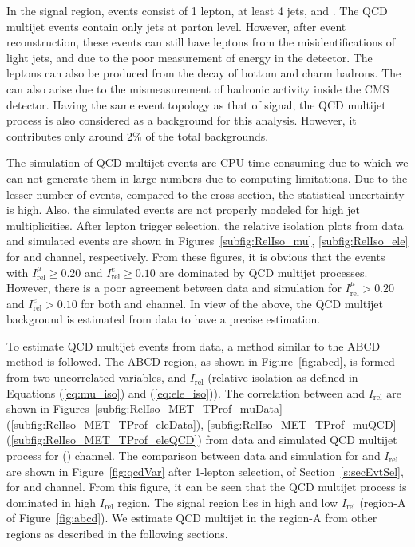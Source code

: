 
In the signal region, events consist of 1 lepton, at least 4 jets, and \MET. The QCD multijet 
events contain only jets at parton level. However, after event reconstruction, these events can 
still have leptons from the misidentifications of light jets, and \MET due to the poor measurement of 
energy in the detector. The leptons can also be produced from the decay of bottom and charm hadrons. 
The \MET can also arise due to the mismeasurement of hadronic activity inside the CMS detector. 
Having the same event topology as that of signal, the QCD multijet process is also considered as a 
background for this analysis. However, it contributes only around 2\% of the total backgrounds.

The simulation of QCD multijet events are CPU time consuming due to which we can not generate them 
in large numbers due to computing limitations. Due to the lesser number of events, 
compared to the cross section, the statistical uncertainty is high. Also, the simulated events 
are not properly modeled for high jet multiplicities. After lepton trigger selection, the relative 
isolation plots from data and simulated events are shown in Figures~\ref{subfig:RelIso_mu},
\ref{subfig:RelIso_ele} for \mujets and \ejets channel, respectively. From these figures, 
it is obvious that the events with $I_{\text{rel}}^{\mu} \geq 0.20$ and $I_{\text{rel}}^{e} \geq 0.10$
are dominated by QCD multijet processes. However, there is a poor agreement between data and simulation
for $I_{\text{rel}}^{\mu} > 0.20$ and $I_{\text{rel}}^{e} > 0.10$ for both \mujets and \ejets channel.
In view of the above, the QCD multijet background is estimated from data to have a precise estimation. 

To estimate QCD multijet events from data, a method similar to the ABCD method is followed. The 
ABCD region, as shown in Figure~\ref{fig:abcd}, is formed from two uncorrelated variables, \MET 
and $I_{\text{rel}}$ (relative isolation as defined in Equations (\ref{eq:mu_iso}) and (\ref{eq:ele_iso})). 
The correlation between \MET and $I_{\text{rel}}$ are shown in 
Figures~\ref{subfig:RelIso_MET_TProf_muData} (\ref{subfig:RelIso_MET_TProf_eleData}),
\ref{subfig:RelIso_MET_TProf_muQCD} (\ref{subfig:RelIso_MET_TProf_eleQCD}) from data and simulated 
QCD multijet process for \mujets (\ejets) channel. The comparison between data and simulation for \MET 
and $I_{\text{rel}}$  are shown in Figure~\ref{fig:qcdVar} after 1-lepton selection, of 
Section~\ref{s:secEvtSel}, for \mujets and \ejets channel. From this figure, it can be 
seen that the QCD multijet process is dominated in high $I_{\text{rel}}$ region. The signal region 
lies in high \MET and low $I_{\text{rel}}$ (region-A of Figure~\ref{fig:abcd}). We estimate QCD 
multijet in the region-A from other regions as described in the following sections.

